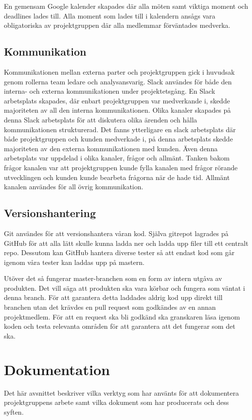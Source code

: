 En gemensam Google kalender skapades där alla möten samt viktiga moment och deadlines lades till. Alla moment som lades till i kalendern ansågs vara obligatoriska av projektgruppen där alla medlemmar förväntades medverka. 

\subsection{Kommunikation}
Kommunikationen mellan externa parter och projektgruppen gick i huvudsak genom rollerna team ledare och analysansvarig. Slack användes för både den interna- och externa kommunikationen under projektetsgång. En Slack arbetsplats skapades, där enbart projektgruppen var medverkande i, skedde majoriteten av all den interna kommunikationen. Olika kanaler skapades på denna Slack arbetsplats för att diskutera olika ärenden och hålla kommunikationen strukturerad. Det fanns ytterligare en slack arbetsplats där både projektgruppen och kunden medverkade i, på denna arbetsplats skedde majoriteten av den externa kommunikationen med kunden. Även denna arbetsplats var uppdelad i olika kanaler, frågor och allmänt. Tanken bakom frågor kanalen var att projektgruppen kunde fylla kanalen med frågor rörande utvecklingen och kunden kunde bearbeta frågorna när de hade tid. Allmänt kanalen användes för all övrig kommunikation.

\subsection{Versionshantering}
Git användes för att versionshantera våran kod. Själva gitrepot lagrades på GitHub för att alla lätt skulle kunna ladda ner och ladda upp filer till ett centralt repo. Dessutom kan GitHub hantera diverse tester så att endast kod som går igenom våra tester kan laddas upp på mastern. 

Utöver det så fungerar master-branchen som en form av intern utgåva av produkten. Det vill säga att produkten ska vara körbar och fungera som väntat i denna branch. För att garantera detta laddades aldrig kod upp direkt till branchen utan det krävdes en pull request som godkändes av en annan projektmedlem. För att en request ska bli godkänd ska granskaren läsa igenom koden och testa relevanta områden för att garantera att det fungerar som det ska.

\section{Dokumentation}
\label{sec:method-documentation}
Det här avsnittet beskriver vilka verktyg som har använts för att dokumentera projektgruppens arbete samt vilka dokument som har producerats och dess syften.

